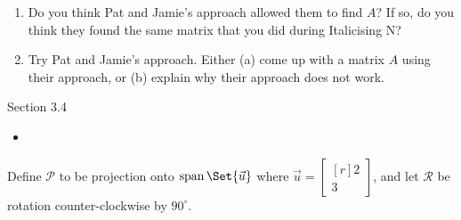\documentclass{problemset}
\DeclareMathOperator{\Span}{span}
\newcommand{\mat}[1]{\begin{bmatrix*}[r]#1\end{bmatrix*}}
\begin{document}
\begin{enumerate}
	\item Do you think Pat and Jamie's approach allowed them to find $A$?  If so, do
		you think they found the same matrix that you did during Italicising N?
	\item Try Pat and Jamie's approach.  Either (a) come up with a matrix $A$ using
		their approach, or (b) explain why their approach does not work.
\end{enumerate}

\newpage
\pagestyle{siefken}


\begin{lesson}
	\newpage

	Section 3.4

	\begin{itemize}
		\item 
	\end{itemize}


	\newpage
\end{lesson}
	\question
	\label{projectionAndRotation}
	Define $\mathcal P$ to be projection onto $\Span\Set{\vec u}$ where $\vec u=\mat{2\\3}$,
	and let $\mathcal R$ be rotation counter-clockwise by $90^\circ$.
\end{document}
